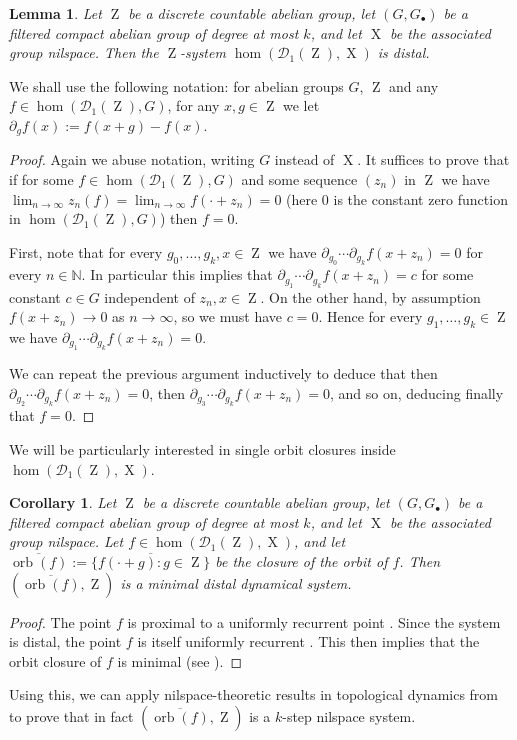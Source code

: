 \documentclass[a4paper,12pt,reqno]{amsart}
\newtheorem{lemma}[theorem]{Lemma}
\newtheorem{corollary}[theorem]{Corollary}
\theoremstyle{definition}
\newcommand{\mc}{\mathcal}
\newcommand{\mb}{\mathbb}
\DeclareMathOperator{\ab}{Z}
\DeclareMathOperator{\ns}{X}
\DeclareMathOperator{\orb}{orb}
\begin{document}
\begin{lemma}\label{lem:hom-are-distal}
Let $\ab$ be a discrete countable abelian group, let $(G,G_\bullet)$ be a filtered compact abelian group of degree at most $k$, and let $\ns$ be the associated group nilspace. Then the $\ab$-system $\hom(\mc{D}_1(\ab),\ns)$ is distal.
\end{lemma}
\noindent We shall use the following notation: for abelian groups $G$, $\ab$ and any $f\in \hom(\mc{D}_1(\ab),G)$, for any $x,g\in \ab$ we let $\partial_g f(x):=f(x+g)-f(x)$.
\begin{proof}
Again we abuse notation, writing $G$ instead of $\ns$. It suffices to prove that if for some $f\in \hom(\mc{D}_1(\ab),G)$ and some sequence $(z_n)$ in $\ab$ we have $\lim_{n\to\infty}z_n(f)=\lim_{n\to\infty} f(\cdot+z_n)=0$ (here $0$ is the constant zero function in $\hom(\mc{D}_1(\ab),G)$) then $f=0$. 

First, note that for every $g_0,\ldots,g_{k},x\in \ab$ we have $\partial_{g_0}\cdots \partial_{g_k} f(x+z_n) = 0$ for every $n\in \mb{N}$. In particular this implies that $\partial_{g_1}\cdots \partial_{g_k} f(x+z_n) = c$ for some constant $c\in G$ independent of $z_n,x\in \ab$. On the other hand, by assumption $f(x+z_n)\to 0$ as $n\to\infty$, so we must have $c=0$. Hence for every $g_1,\ldots,g_k\in \ab$ we have $\partial_{g_1}\cdots \partial_{g_k} f(x+z_n) =0$. 

We can repeat the previous argument inductively to deduce that then $\partial_{g_2}\cdots \partial_{g_k} f(x+z_n) =0$, then $\partial_{g_3}\cdots \partial_{g_k} f(x+z_n) =0$, and so on, deducing finally that $f=0$.
\end{proof}

\noindent We will be particularly interested in single orbit closures inside $\hom(\mc{D}_1(\ab),\ns)$. 

\begin{corollary}
Let $\ab$ be a discrete countable abelian group, let $(G,G_\bullet)$ be a filtered compact abelian group of degree at most $k$, and let $\ns$ be the associated group nilspace. Let $f\in \hom(\mc{D}_1(\ab),\ns)$, and let  $\overline{\orb(f)}:=\overline{\{f(\cdot+g):g\in \ab\}}$ be the closure of the orbit of $f$. Then $(\overline{\orb(f)},\ab)$ is a minimal distal dynamical system. 
\end{corollary}
\begin{proof}
The point $f$ is proximal to a uniformly recurrent point \cite[Theorem 8.7]{Furstenberg}. Since the system is distal, the point $f$ is itself uniformly recurrent \cite[Corollary]{Furstenberg}. This then implies that the orbit closure of $f$ is minimal (see \cite[Proposition 2.4.5]{Hass&Katok}).  
\end{proof}
\noindent Using this, we can apply nilspace-theoretic results in topological dynamics from \cite{GGY} to prove that in fact $(\overline{\orb(f)},\ab)$ is a $k$-step nilspace system.
\end{document}
